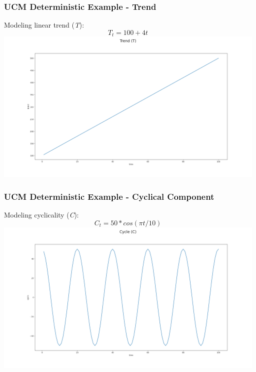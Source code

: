 \documentclass{beamer}
\begin{document}
\begin{frame}[t]\frametitle{UCM Deterministic Example - Trend}
Modeling linear trend (\textit{T}): \\
\[T_{t} = 100+4t\]
\includegraphics[width=\textwidth, height=0.7\textheight]{ucm_deterministic_trend}
\end{frame}

\begin{frame}[t]\frametitle{UCM Deterministic Example - Cyclical Component}
Modeling cyclicality (\textit{C}): \\
\[C_{t} = 50*cos(\pi t/10)\]
\includegraphics[width=\textwidth, height=0.7\textheight]{ucm_deterministic_cycle}
\end{frame}
\end{document}
